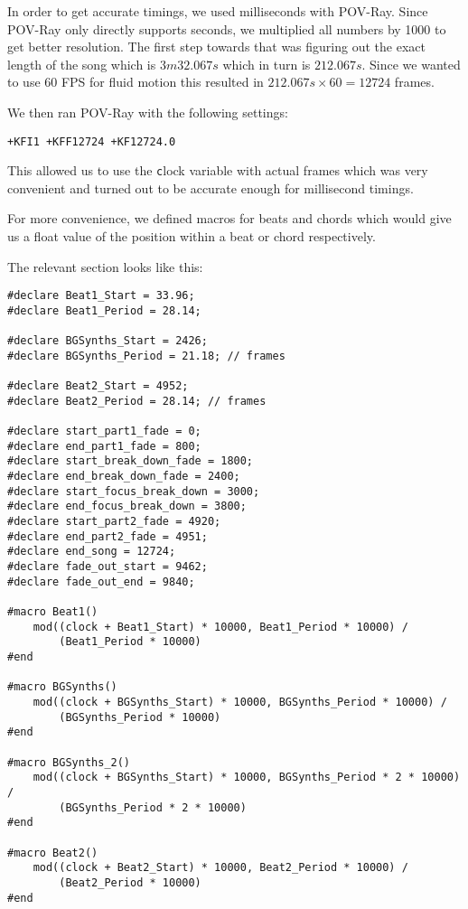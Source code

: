 \documentclass[a4paper, 12pt]{scrartcl}
\begin{document}
    In order to get accurate timings, we used milliseconds with POV-Ray. Since POV-Ray only
    directly supports seconds, we multiplied all numbers by 1000 to get better resolution.
    The first step towards that was figuring out the exact length of the song which is
    \(3m32.067s\) which in turn is \(212.067s\). Since we wanted to use 60 FPS for fluid motion
    this resulted in \(212.067s \times 60 = 12724\) frames. 

    We then ran POV-Ray with the following settings:
    \begin{verbatim}+KFI1 +KFF12724 +KF12724.0\end{verbatim}
    This allowed us to use the \texttt clock variable with actual frames which was very convenient
    and turned out to be accurate enough for millisecond timings.

    For more convenience, we defined macros for beats and chords which would give us a float value
    of the position within a beat or chord respectively.

    The relevant section looks like this:

    \begin{verbatim}
#declare Beat1_Start = 33.96;
#declare Beat1_Period = 28.14;

#declare BGSynths_Start = 2426;
#declare BGSynths_Period = 21.18; // frames

#declare Beat2_Start = 4952;
#declare Beat2_Period = 28.14; // frames

#declare start_part1_fade = 0;
#declare end_part1_fade = 800;
#declare start_break_down_fade = 1800;
#declare end_break_down_fade = 2400;
#declare start_focus_break_down = 3000;
#declare end_focus_break_down = 3800;
#declare start_part2_fade = 4920;
#declare end_part2_fade = 4951;
#declare end_song = 12724;
#declare fade_out_start = 9462;
#declare fade_out_end = 9840;

#macro Beat1()
    mod((clock + Beat1_Start) * 10000, Beat1_Period * 10000) /
        (Beat1_Period * 10000)
#end

#macro BGSynths()
    mod((clock + BGSynths_Start) * 10000, BGSynths_Period * 10000) /
        (BGSynths_Period * 10000)
#end

#macro BGSynths_2()
    mod((clock + BGSynths_Start) * 10000, BGSynths_Period * 2 * 10000) /
        (BGSynths_Period * 2 * 10000)
#end

#macro Beat2()
    mod((clock + Beat2_Start) * 10000, Beat2_Period * 10000) /
        (Beat2_Period * 10000)
#end
    \end{verbatim}
\end{document}
